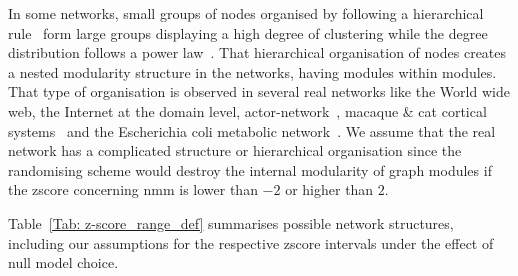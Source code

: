 In some networks, small groups of nodes organised by following a hierarchical rule~\cite{BARABASI2001559} form large groups displaying a high degree of clustering while the degree distribution follows a power law~\cite{Barabasi2003}. That hierarchical organisation of nodes creates a nested modularity structure in the networks, having modules within modules. That type of organisation is observed in several real networks like the World wide web, the Internet at the domain level, actor-network~\cite{Barabasi2003}, macaque \& cat cortical systems~\cite{Young2000} and the Escherichia coli metabolic network~\cite{Ravasz1551}. We assume that the real network has a complicated structure or hierarchical organisation since the randomising scheme would destroy the internal modularity of graph modules if the \acs{zscore} concerning \acs{nmm} is lower than $-2$ or higher than $2$. 

Table~\ref{Tab: z-score_range_def} summarises possible network structures, including our assumptions for the respective \acs{zscore} intervals under the effect of null model choice.

